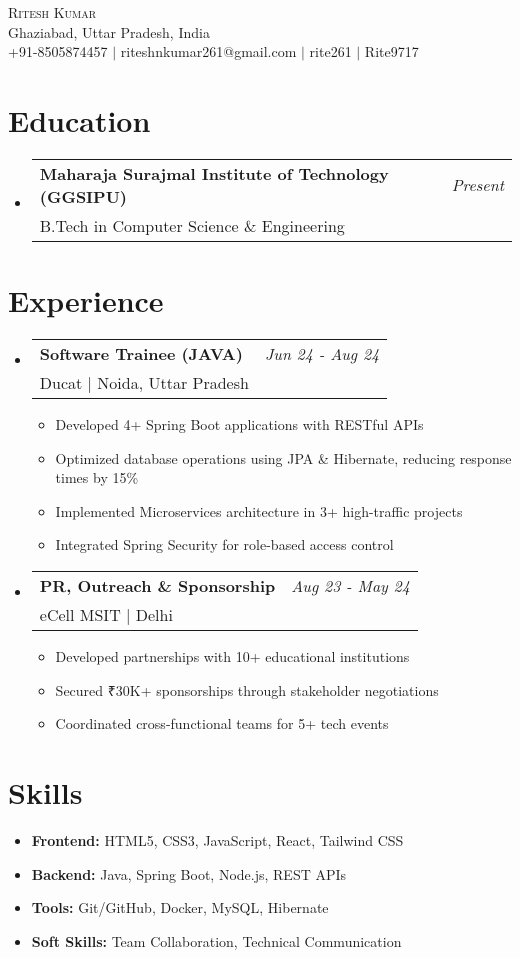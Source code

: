 \documentclass[a4paper,11pt]{article}
\makeatletter
\newcommand{\resumeItem}[1]{\item #1}
\newcommand{\resumeSubheading}[4]{
  \vspace{-1pt}\item
    \begin{tabular*}{0.97\textwidth}{l@{\extracolsep{\fill}}r}
      \textbf{#1} & \textit{\small #4} \\
      \textnormal{\small#2} & \textit{\small #3} \\
    \end{tabular*}\vspace{-2pt}
}
\newcommand{\resumeSubItem}[1]{\resumeItem{\small{#1}}}
\newcommand{\resumeSubHeadingListStart}{\begin{itemize}[leftmargin=0.15in, label={}, itemsep=1pt]}
\newcommand{\resumeSubHeadingListEnd}{\end{itemize}}
\newcommand{\resumeItemListStart}{\begin{itemize}[leftmargin=0.2in, itemsep=0pt, parsep=0pt]}
\newcommand{\resumeItemListEnd}{\end{itemize}\vspace{-5pt}}
\makeatother
\begin{document}
\begin{center}
     {\LARGE \scshape Ritesh Kumar} \\ 
    \small Ghaziabad, Uttar Pradesh, India \\ \vspace{1.5mm}
     +91-8505874457 $|$
     riteshnkumar261@gmail.com $|$
     rite261 $|$ 
     Rite9717
\end{center}

\section{Education}
\resumeSubHeadingListStart
    \resumeSubheading{Maharaja Surajmal Institute of Technology (GGSIPU)}{B.Tech in Computer Science \& Engineering}{}{Present}
\resumeSubHeadingListEnd

\section{Experience}
\vspace{1mm}
\resumeSubHeadingListStart
    \resumeSubheading{Software Trainee (JAVA)}{Ducat | Noida, Uttar Pradesh}{}{Jun 24 - Aug 24}
    \resumeItemListStart
        \resumeSubItem{Developed 4+ Spring Boot applications with RESTful APIs}
        \resumeSubItem{Optimized database operations using JPA \& Hibernate, reducing response times by 15\%}
        \resumeSubItem{Implemented Microservices architecture in 3+ high-traffic projects}
        \resumeSubItem{Integrated Spring Security for role-based access control}
    \resumeItemListEnd

    \vspace{3mm}
    
    \resumeSubheading{PR, Outreach \& Sponsorship}{eCell MSIT | Delhi}{}{Aug 23 - May 24}
    \resumeItemListStart
        \resumeSubItem{Developed partnerships with 10+ educational institutions}
        \resumeSubItem{Secured ₹30K+ sponsorships through stakeholder negotiations}
        \resumeSubItem{Coordinated cross-functional teams for 5+ tech events}
    \resumeItemListEnd
\resumeSubHeadingListEnd

\section{Skills}
    \vspace{1mm}
    \resumeItemListStart
        \resumeItem{\textbf{Frontend:} HTML5, CSS3, JavaScript, React, Tailwind CSS}
        \resumeItem{\textbf{Backend:} Java, Spring Boot, Node.js, REST APIs}
        \resumeItem{\textbf{Tools:} Git/GitHub, Docker, MySQL, Hibernate}
        \resumeItem{\textbf{Soft Skills:} Team Collaboration, Technical Communication}
    \resumeItemListEnd
\end{document}
